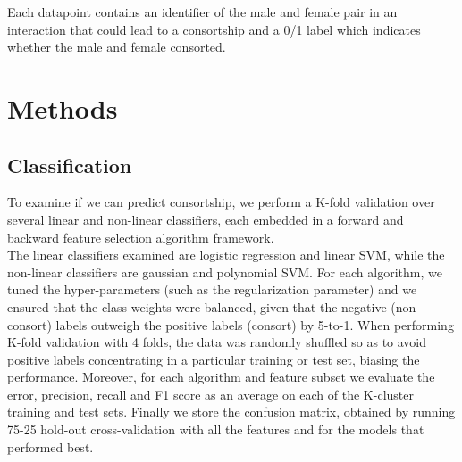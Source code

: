 \documentclass[twoside,twocolumn,paper=letter,fontsize=11pt]{article}
\begin{document}
Each datapoint contains an identifier of the male and female pair in an
interaction that could lead to a consortship and a 0/1 label which indicates
whether the male and female consorted.



\section{Methods}


\subsection{Classification}
To examine if we can predict consortship, we perform a K-fold validation over
several linear and non-linear classifiers, each embedded in a forward and
backward feature selection algorithm framework.\\

The linear classifiers examined are logistic regression and linear SVM, while
the non-linear classifiers are gaussian and polynomial SVM. For each algorithm,
we tuned the hyper-parameters (such as the regularization parameter) and we
ensured that the class weights were balanced, given that the negative
(non-consort) labels outweigh the positive labels (consort) by 5-to-1. When
performing K-fold validation with 4 folds, the data was randomly shuffled so as
to avoid positive labels concentrating in a particular training or test set,
biasing the performance. Moreover, for each algorithm and feature subset we
evaluate the error, precision, recall and F1 score as an average on each of
the K-cluster training and test sets. Finally we store the confusion matrix,
obtained by running 75-25 hold-out cross-validation with all the features and
for the models that performed best.
\end{document}
